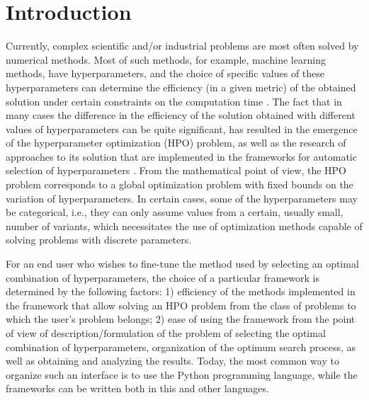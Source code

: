\documentclass[preprint,12pt]{elsarticle}
\begin{document}
\linenumbers

\section{Introduction}
\label{sec_intro}

Currently, complex scientific and/or industrial problems are most often solved by numerical methods. Most of such methods, for example, machine learning methods, have hyperparameters, and the choice of specific values of these hyperparameters can determine the efficiency (in a given metric) of the obtained solution under certain constraints on the computation time \cite{Hutter2019,nikitin2021}. The fact that in many cases the difference in the efficiency of the solution obtained with different values of hyperparameters can be quite significant, has resulted in the emergence of the hyperparameter optimization (HPO) problem, as well as the research of approaches to its solution that are implemented in the frameworks for automatic selection of hyperparameters \cite{Tune, optuna, hyperopt,Sherpa}. From the mathematical point of view, the HPO problem corresponds to a global optimization problem with fixed bounds on the variation of hyperparameters.  In certain cases, some of the hyperparameters may be categorical, i.e., they can only assume values from a certain, usually small, number of variants, which necessitates the use of optimization methods capable of solving problems with discrete parameters.

For an end user who wishes to fine-tune the method used by selecting an optimal combination of hyperparameters, the choice of a particular framework is determined by the following factors: 1) efficiency of the methods implemented in the framework that allow solving an HPO problem from the class of problems to which the user's problem belongs; 2) ease of using the  framework from the point of view of description/formulation of the problem of selecting the optimal combination of hyperparameters, organization of the optimum search process, as well as obtaining and analyzing the results. Today, the most common way to organize such an interface is to use the Python programming language, while the frameworks can be written both in this and other languages.
\end{document}
